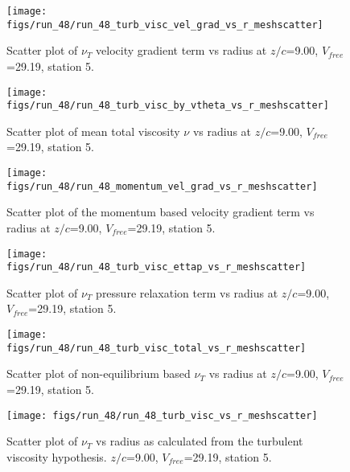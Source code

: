 \begin{figure}[H]
\centering
\texttt{[image: figs/run\_48/run\_48\_turb\_visc\_vel\_grad\_vs\_r\_meshscatter]}
\caption{Scatter plot of $\nu_T$ velocity gradient term vs radius at $z/c$=9.00, $V_{free}$=29.19, station 5.}
\end{figure}


\begin{figure}[H]
\centering
\texttt{[image: figs/run\_48/run\_48\_turb\_visc\_by\_vtheta\_vs\_r\_meshscatter]}
\caption{Scatter plot of mean total viscosity $\nu$ vs radius at $z/c$=9.00, $V_{free}$=29.19, station 5.}
\end{figure}


\begin{figure}[H]
\centering
\texttt{[image: figs/run\_48/run\_48\_momentum\_vel\_grad\_vs\_r\_meshscatter]}
\caption{Scatter plot of the momentum based velocity gradient term vs radius at $z/c$=9.00, $V_{free}$=29.19, station 5.}
\end{figure}


\begin{figure}[H]
\centering
\texttt{[image: figs/run\_48/run\_48\_turb\_visc\_ettap\_vs\_r\_meshscatter]}
\caption{Scatter plot of $\nu_T$ pressure relaxation term vs radius at $z/c$=9.00, $V_{free}$=29.19, station 5.}
\end{figure}


\begin{figure}[H]
\centering
\texttt{[image: figs/run\_48/run\_48\_turb\_visc\_total\_vs\_r\_meshscatter]}
\caption{Scatter plot of non-equilibrium based $\nu_T$ vs radius at $z/c$=9.00, $V_{free}$=29.19, station 5.}
\end{figure}


\begin{figure}[H]
\centering
\texttt{[image: figs/run\_48/run\_48\_turb\_visc\_vs\_r\_meshscatter]}
\caption{Scatter plot of $\nu_T$ vs radius as calculated from the turbulent viscosity hypothesis. $z/c$=9.00, $V_{free}$=29.19, station 5.}
\end{figure}


